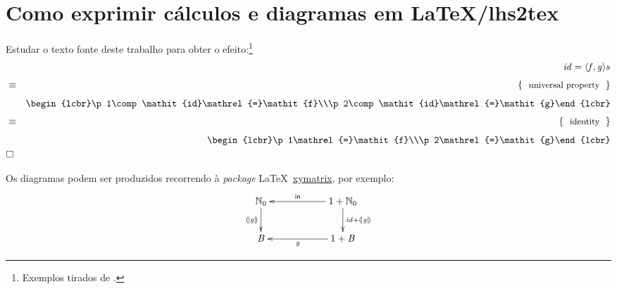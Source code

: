\documentclass[a4paper]{article}
\newcommand{\Varid}[1]{\mathit{#1}}
\begin{document}
\section{Como exprimir cálculos e diagramas em LaTeX/lhs2tex}
Estudar o texto fonte deste trabalho para obter o efeito:\footnote{Exemplos tirados de \cite{Ol18}.} 
\begin{eqnarray*}
\start
    \ensuremath{\Varid{id}\mathrel{=}\conj{\Varid{f}}{\Varid{g}}}
%
s\just\equiv{ universal property }
%
        \ensuremath{\begin{lcbr}\p1\comp \Varid{id}\mathrel{=}\Varid{f}\\\p2\comp \Varid{id}\mathrel{=}\Varid{g}\end{lcbr}}
%
\just\equiv{ identity }
%
        \ensuremath{\begin{lcbr}\p1\mathrel{=}\Varid{f}\\\p2\mathrel{=}\Varid{g}\end{lcbr}}
\qed
\end{eqnarray*}

Os diagramas podem ser produzidos recorrendo à \emph{package} \LaTeX\ 
\href{https://ctan.org/pkg/xymatrix}{xymatrix}, por exemplo: 
\begin{eqnarray*}
\xymatrix@C=2cm{
    \ensuremath{\N_0}
           \ar[d]_-{\ensuremath{\cata{\Varid{g}}}}
&
    \ensuremath{\mathrm{1}\mathbin{+}\N_0}
           \ar[d]^{\ensuremath{\Varid{id}\mathbin{+}\cata{\Varid{g}}}}
           \ar[l]_-{\ensuremath{\mathsf{in}}}
\\
     \ensuremath{\mathit B}
&
     \ensuremath{\mathrm{1}\mathbin{+}\mathit B}
           \ar[l]^-{\ensuremath{\Varid{g}}}
}
\end{eqnarray*}



\printindex



\end{document}
